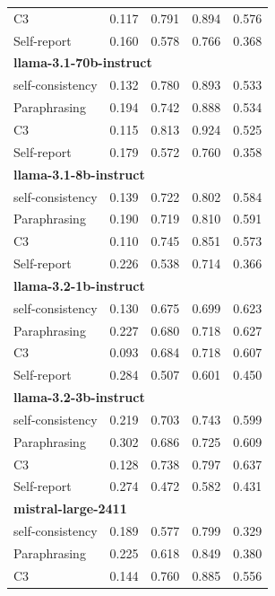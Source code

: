 \documentclass[11pt]{article}
\theoremstyle{plain}
\theoremstyle{definition}
\theoremstyle{remark}
\begin{document}
\begin{table}[p]
\begin{minipage}[t]{0.48\textwidth}
\begin{tabular}{lcccc}
       C3             & 0.117 & 0.791 & 0.894 & 0.576 \\
        Self-report      & 0.160 & 0.578 & 0.766 & 0.368 \\
        \midrule
        \multicolumn{5}{l}{\textbf{llama-3.1-70b-instruct}} \\
        self-consistency & 0.132 & 0.780 & 0.893 & 0.533 \\
        Paraphrasing     & 0.194 & 0.742 & 0.888 & 0.534 \\
       C3             & 0.115 & 0.813 & 0.924 & 0.525 \\
        Self-report      & 0.179 & 0.572 & 0.760 & 0.358 \\
        \midrule
        \multicolumn{5}{l}{\textbf{llama-3.1-8b-instruct}} \\
        self-consistency & 0.139 & 0.722 & 0.802 & 0.584 \\
        Paraphrasing     & 0.190 & 0.719 & 0.810 & 0.591 \\
       C3             & 0.110 & 0.745 & 0.851 & 0.573 \\
        Self-report      & 0.226 & 0.538 & 0.714 & 0.366 \\
        \midrule
        \multicolumn{5}{l}{\textbf{llama-3.2-1b-instruct}} \\
        self-consistency & 0.130 & 0.675 & 0.699 & 0.623 \\
        Paraphrasing     & 0.227 & 0.680 & 0.718 & 0.627 \\
       C3             & 0.093 & 0.684 & 0.718 & 0.607 \\
        Self-report      & 0.284 & 0.507 & 0.601 & 0.450 \\
        \midrule
        \multicolumn{5}{l}{\textbf{llama-3.2-3b-instruct}} \\
        self-consistency & 0.219 & 0.703 & 0.743 & 0.599 \\
        Paraphrasing     & 0.302 & 0.686 & 0.725 & 0.609 \\
       C3             & 0.128 & 0.738 & 0.797 & 0.637 \\
        Self-report      & 0.274 & 0.472 & 0.582 & 0.431 \\
        \midrule
        \multicolumn{5}{l}{\textbf{mistral-large-2411}} \\
        self-consistency & 0.189 & 0.577 & 0.799 & 0.329 \\
        Paraphrasing     & 0.225 & 0.618 & 0.849 & 0.380 \\
       C3             & 0.144 & 0.760 & 0.885 & 0.556 \\

\end{tabular}
\end{minipage}
\end{table}
\end{document}
